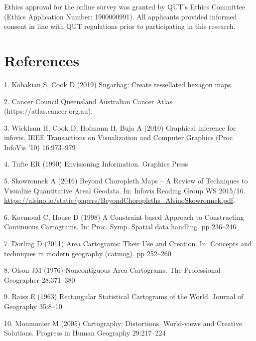 \documentclass[conference,final,]{IEEEtran}
\begin{document}
Ethics approval for the online survey was granted by QUT's Ethics Committee (Ethics Application Number: 1900000991). All applicants provided informed consent in line with QUT regulations prior to participating in this research.

\newpage

\hypertarget{references}{%
\section*{References}\label{references}}

\hypertarget{refs}{}
\leavevmode\hypertarget{ref-sugarbag}{}%
1. Kobakian S, Cook D (2019) Sugarbag: Create tessellated hexagon maps.

\leavevmode\hypertarget{ref-atlas}{}%
2. Cancer Council Queensland Australian Cancer Atlas (https://atlas.cancer.org.au).

\leavevmode\hypertarget{ref-GIIV}{}%
3. Wickham H, Cook D, Hofmann H, Buja A (2010) Graphical inference for infovis. IEEE Transactions on Visualization and Computer Graphics (Proc InfoVis '10) 16:973--979

\leavevmode\hypertarget{ref-EI}{}%
4. Tufte ER (1990) Envisioning Information. Graphics Press

\leavevmode\hypertarget{ref-BCM}{}%
5. Skowronnek A (2016) Beyond Choropleth Maps -- A Review of Techniques to Visualize Quantitative Areal Geodata. In: Infovis Reading Group WS 2015/16. \url{https://alsino.io/static/papers/BeyondChoropleths_AlsinoSkowronnek.pdf}.

\leavevmode\hypertarget{ref-CBATCC}{}%
6. Kocmoud C, House D (1998) A Constraint-based Approach to Constructing Continuous Cartograms. In: Proc. Symp. Spatial data handling. pp 236--246

\leavevmode\hypertarget{ref-ACTUC}{}%
7. Dorling D (2011) Area Cartograms: Their Use and Creation. In: Concepts and techniques in modern geography (catmog). pp 252--260

\leavevmode\hypertarget{ref-NAC}{}%
8. Olson JM (1976) Noncontiguous Area Cartograms. The Professional Geographer 28:371--380

\leavevmode\hypertarget{ref-RSCW}{}%
9. Raisz E (1963) Rectangular Statistical Cartograms of the World. Journal of Geography 35:8--10

\leavevmode\hypertarget{ref-CDWCS}{}%
10. Monmonier M (2005) Cartography: Distortions, World-views and Creative Solutions. Progress in Human Geography 29:217--224
\end{document}
